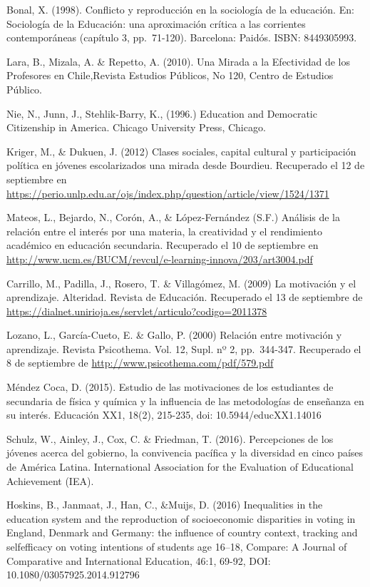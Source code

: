 \documentclass[
]{article}
\begin{document}
Bonal, X. (1998). Conflicto y reproducción en la sociología de la
educación. En: Sociología de la Educación: una aproximación crítica a
las corrientes contemporáneas (capítulo 3, pp.~71-120). Barcelona:
Paidós. ISBN: 8449305993.

Lara, B., Mizala, A. \& Repetto, A. (2010). Una Mirada a la Efectividad
de los Profesores en Chile,Revista Estudios Públicos, No 120, Centro de
Estudios Público.

Nie, N., Junn, J., Stehlik-Barry, K., (1996.) Education and Democratic
Citizenship in America. Chicago University Press, Chicago.

Kriger, M., \& Dukuen, J. (2012) Clases sociales, capital cultural y
participación política en jóvenes escolarizados una mirada desde
Bourdieu. Recuperado el 12 de septiembre en
\url{https://perio.unlp.edu.ar/ojs/index.php/question/article/view/1524/1371}

Mateos, L., Bejardo, N., Corón, A., \& López-Fernández (S.F.) Análisis
de la relación entre el interés por una materia, la creatividad y el
rendimiento académico en educación secundaria. Recuperado el 10 de
septiembre en
\url{http://www.ucm.es/BUCM/revcul/e-learning-innova/203/art3004.pdf}

Carrillo, M., Padilla, J., Rosero, T. \& Villagómez, M. (2009) La
motivación y el aprendizaje. Alteridad. Revista de Educación. Recuperado
el 13 de septiembre de
\url{https://dialnet.unirioja.es/servlet/articulo?codigo=2011378}

Lozano, L., García-Cueto, E. \& Gallo, P. (2000) Relación entre
motivación y aprendizaje. Revista Psicothema. Vol. 12, Supl. nº 2,
pp.~344-347. Recuperado el 8 de septiembre de
\url{http://www.psicothema.com/pdf/579.pdf}

Méndez Coca, D. (2015). Estudio de las motivaciones de los estudiantes
de secundaria de física y química y la influencia de las metodologías de
enseñanza en su interés. Educación XX1, 18(2), 215-235, doi:
10.5944/educXX1.14016

Schulz, W., Ainley, J., Cox, C. \& Friedman, T. (2016). Percepciones de
los jóvenes acerca del gobierno, la convivencia pacífica y la diversidad
en cinco países de América Latina. International Association for the
Evaluation of Educational Achievement (IEA).

Hoskins, B., Janmaat, J., Han, C., \&Muijs, D. (2016) Inequalities in
the education system and the reproduction of socioeconomic disparities
in voting in England, Denmark and Germany: the influence of country
context, tracking and selfefficacy on voting intentions of students age
16--18, Compare: A Journal of Comparative and International Education,
46:1, 69-92, DOI: 10.1080/03057925.2014.912796
\end{document}
